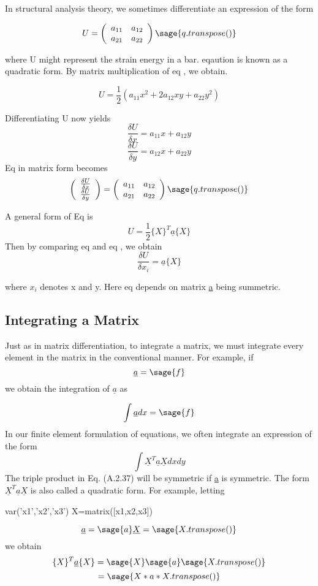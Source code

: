 \documentclass[12pt]{report}
\begin{document}
In structural analysis theory, we sometimes differentiate an expression of the form 

$$ U =\left(\begin{array}{rr}a_{11} & a_{12} \\a_{21} & a_{22}\\ \end{array}\right)\sage{q.transpose()}$$

where U might represent the strain energy in a bar. eqaution is known as a quadratic form. By matrix multiplication of eq , we obtain.

$$ U = \frac{1}{2}(a_{{11}}x^2 +2a_{{12}}xy + a_{{22}}y^2)$$

Differentiating U now yields 
$$ \frac{\delta U}{\delta x} = a_{{11}}x + a_{{12}}y $$
$$ \frac{\delta U}{\delta y} = a_{{12}}x + a_{{22}}y $$ 
Eq in matrix form becomes
$$\left(\begin{array}{rr} \frac{\delta U}{\delta x} \\ \frac{\delta U}{\delta y} \\ \end{array}\right) = \left(\begin{array}{rr}a_{11} & a_{12} \\a_{21} & a_{22}\\ \end{array}\right) \sage{q.transpose()}$$

A general form of Eq is 
$$ U = \frac{1}{2}\{X\}^T\underline{a}\{X\}$$
Then by comparing eq and eq , we obtain 
$$\frac{ \delta U}{\delta x_{i}} = \underline{a}\{X\}$$

where $x_{i}$ denotes x and y. Here eq depends on matrix \underline{a} being summetric.

\subsection{Integrating a Matrix}
Just as in matrix differentiation, to integrate a matrix, we must
integrate every element in the matrix in the conventional manner. For
example, if
$$ \underline{a} = \sage{f}$$
we obtain the integration of $\underline{a}$ as

$$\int \underline{a}dx = \sage{f}$$
In our finite element formulation of equations, we often integrate an
expression of the form
$$\int \underline{X}^T\underline{a}\underline{X} dx dy $$
The triple product in Eq. (A.2.37) will be symmetric if \underline{a} is
symmetric. The form $\underline{X}^T\underline{a}\underline{X}$ is also called a quadratic form. For
example, letting
\begin{sagesilent}
var('x1','x2','x3')
X=matrix([x1,x2,x3])
\end{sagesilent}
$$\underline{a} = \sage{a} \underline{X}= \sage{X.transpose()}$$
we obtain
$$\{X\}^T\underline{a}\{X\}= \sage{X}\sage{a}\sage{X.transpose()}$$
$$=\sage{X*a*X.transpose()}$$
\end{document}

